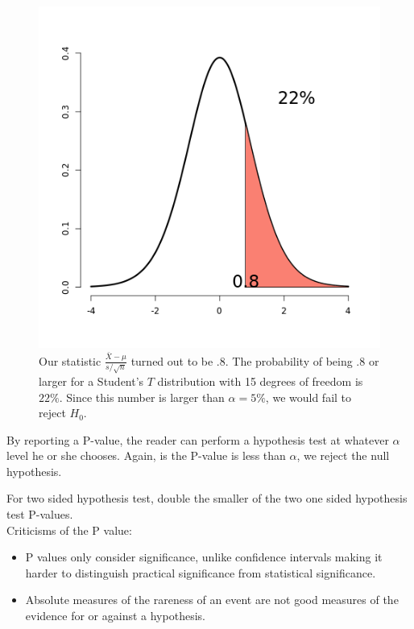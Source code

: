 \documentclass{homework}
\begin{document}
\begin{figure}
    \centering
    \includegraphics[scale = .4]{figs/P-value T statistic.png}
    \caption{Our statistic $\frac{\bar{X}-\mu}{s/\sqrt{n}}$ turned out to be .8. The probability of being .8 or larger for a Student's $T$ distribution with 15 degrees of freedom is $22\%$. Since this number is larger than $\alpha = 5\%$, we would fail to reject $H_0$. }
    \label{fig: P-value T statistic}
\end{figure}

By reporting a P-value, the reader can perform a hypothesis test at whatever $\alpha$ level he or she chooses. Again, is the P-value is less than $\alpha$, we reject the null hypothesis.

For two sided hypothesis test, double the smaller of the two one sided hypothesis test P-values. \\ 

Criticisms of the P value:

\begin{itemize}
    \item P values only consider significance, unlike confidence intervals making it harder to distinguish practical significance from statistical significance.
    \item Absolute measures of the rareness of an event are not good measures of the evidence for or against a hypothesis.
\end{itemize}
\end{document}
